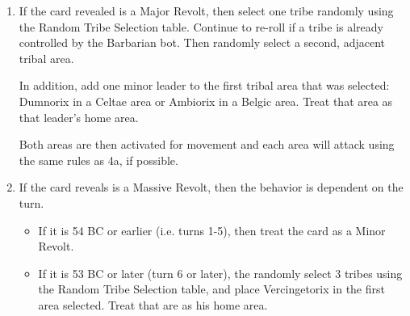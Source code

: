 \begin{enumerate}
  \item If the card revealed is a Major Revolt, then select one tribe randomly using the Random Tribe Selection table. Continue to re-roll if a tribe is already controlled by the Barbarian bot. Then randomly select a second, adjacent tribal area.
  
  In addition, add one minor leader to the first tribal area that was selected: Dumnorix in a Celtae area or Ambiorix in a Belgic area. Treat that area as that leader's home area.
  
  Both areas are then activated for movement and each area will attack using the same rules as 4a, if possible.
  
  \item If the card reveals is a Massive Revolt, then the behavior is dependent on the turn.
  \begin{itemize}
    \item If it is 54 BC or earlier (i.e. turns 1-5), then treat the card as a Minor Revolt.
    \item If it is 53 BC or later (turn 6 or later), the randomly select 3 tribes using the Random Tribe Selection table, and place Vercingetorix in the first area selected. Treat that are as his home area.
  \end{itemize}
\end{enumerate}

